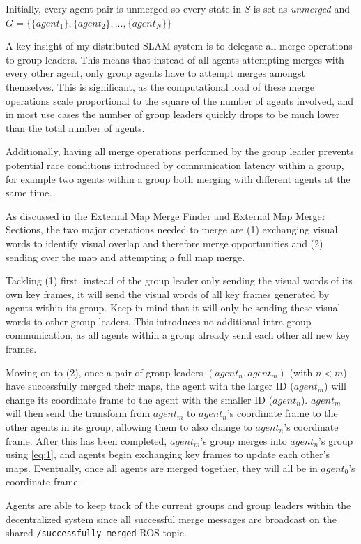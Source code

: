 Initially, every agent pair is unmerged so every state in $S$ is set as \textit{unmerged} and $G=\{\{agent_1\}, \{agent_2\}, ..., \{agent_N\}\}$

A key insight of my distributed SLAM system is to delegate all merge operations to group leaders. This means that instead of all agents attempting merges with every other agent, only group agents have to attempt merges amongst themselves. This is significant, as the computational load of these merge operations scale proportional to the square of the number of agents involved, and in most use cases the number of group leaders quickly drops to be much lower than the total number of agents.

Additionally, having all merge operations performed by the group leader prevents potential race conditions introduced by communication latency within a group, for example two agents within a group both merging with different agents at the same time.

As discussed in the \hyperref[sec:external-map-merge-finder]{External Map Merge Finder} and \hyperref[sec:external-map-merger]{External Map Merger} Sections, the two major operations needed to merge are (1) exchanging visual words to identify visual overlap and therefore merge opportunities and (2) sending over the map and attempting a full map merge.

Tackling (1) first, instead of the group leader only sending the visual words of its own key frames, it will send the visual words of all key frames generated by agents within its group. Keep in mind that it will only be sending these visual words to other group leaders. This introduces no additional intra-group communication, as all agents within a group already send each other all new key frames.

Moving on to (2), once a pair of group leaders $(agent_n, agent_m)$ (with $n<m$) have successfully merged their maps, the agent with the larger ID ($agent_m$) will change its coordinate frame to the agent with the smaller ID ($agent_n$). $agent_m$ will then send the transform from $agent_m$ to $agent_n$'s coordinate frame to the other agents in its group, allowing them to also change to $agent_n$'s coordinate frame. After this has been completed, $agent_m$'s group merges into $agent_n$'s group using \autoref{eq:1}, and agents begin exchanging key frames to update each other's maps. Eventually, once all agents are merged together, they will all be in $agent_0$'s coordinate frame.

Agents are able to keep track of the current groups and group leaders within the decentralized system since all successful merge messages are broadcast on the shared \texttt{/successfully\_merged} ROS topic.

